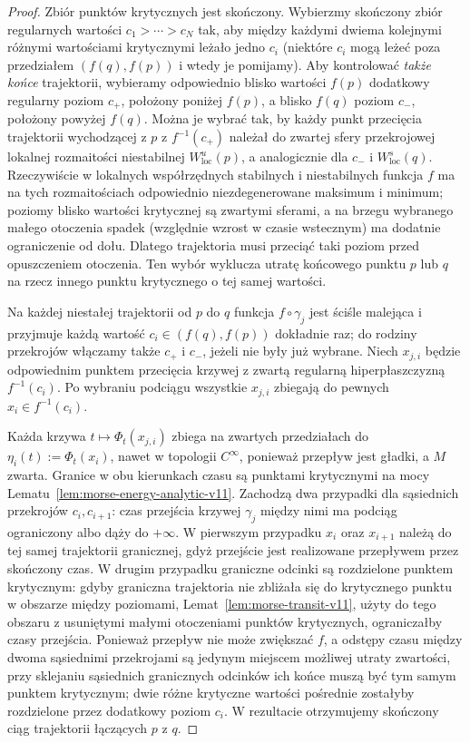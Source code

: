 \begin{proof}
Zbiór punktów krytycznych jest skończony. Wybierzmy
skończony zbiór regularnych wartości $c_1>\cdots>c_N$
tak, aby między każdymi dwiema kolejnymi różnymi wartościami
krytycznymi leżało jedno $c_i$ (niektóre $c_i$ mogą leżeć
poza przedziałem $(f(q),f(p))$ i wtedy je pomijamy).
Aby kontrolować \emph{także końce} trajektorii, wybieramy
odpowiednio blisko wartości $f(p)$ dodatkowy regularny
poziom $c_+$, położony poniżej $f(p)$, a blisko $f(q)$
poziom $c_-$, położony powyżej $f(q)$.
Można je wybrać tak, by każdy punkt przecięcia trajektorii
wychodzącej z $p$ z $f^{-1}(c_+)$ należał do zwartej
sfery przekrojowej lokalnej rozmaitości niestabilnej
$W^u_{\mathrm{loc}}(p)$, a analogicznie dla $c_-$
i $W^s_{\mathrm{loc}}(q)$. Rzeczywiście w lokalnych
współrzędnych stabilnych i niestabilnych funkcja $f$
ma na tych rozmaitościach odpowiednio niezdegenerowane
maksimum i minimum; poziomy blisko wartości krytycznej
są zwartymi sferami, a na brzegu wybranego małego
otoczenia spadek (względnie wzrost w czasie wstecznym)
ma dodatnie ograniczenie od dołu. Dlatego trajektoria
musi przeciąć taki poziom przed opuszczeniem otoczenia.
Ten wybór wyklucza utratę końcowego punktu $p$ lub $q$
na rzecz innego punktu krytycznego o tej samej wartości.

Na każdej niestałej trajektorii od $p$ do $q$ funkcja
$f\circ\gamma_j$ jest ściśle malejąca i przyjmuje każdą
wartość $c_i\in(f(q),f(p))$ dokładnie raz; do rodziny
przekrojów włączamy także $c_+$ i $c_-$, jeżeli nie były
już wybrane. Niech
$x_{j,i}$ będzie odpowiednim punktem przecięcia krzywej
z zwartą regularną hiperpłaszczyzną $f^{-1}(c_i)$.
Po wybraniu podciągu wszystkie $x_{j,i}$ zbiegają do pewnych
$x_i\in f^{-1}(c_i)$.

Każda krzywa $t\mapsto\Phi_t(x_{j,i})$ zbiega na zwartych
przedziałach do $\eta_i(t):=\Phi_t(x_i)$, nawet w topologii
$C^\infty$, ponieważ przepływ jest gładki, a $M$ zwarta.
Granice w obu kierunkach czasu są punktami krytycznymi
na mocy Lematu~\ref{lem:morse-energy-analytic-v11}.
Zachodzą dwa przypadki dla sąsiednich przekrojów $c_i,c_{i+1}$:
czas przejścia krzywej $\gamma_j$ między nimi ma podciąg
ograniczony albo dąży do $+\infty$.
W pierwszym przypadku $x_i$ oraz $x_{i+1}$ należą do tej
samej trajektorii granicznej, gdyż przejście jest realizowane
przepływem przez skończony czas.
W drugim przypadku graniczne odcinki są rozdzielone
punktem krytycznym: gdyby graniczna trajektoria nie
zbliżała się do krytycznego punktu w obszarze między
poziomami, Lemat~\ref{lem:morse-transit-v11}, użyty do
tego obszaru z usuniętymi małymi otoczeniami punktów
krytycznych, ograniczałby czasy przejścia.
Ponieważ przepływ nie może zwiększać $f$, a odstępy czasu
między dwoma sąsiednimi przekrojami są jedynym miejscem
możliwej utraty zwartości, przy sklejaniu
sąsiednich granicznych odcinków ich końce muszą być tym
samym punktem krytycznym; dwie różne krytyczne wartości
pośrednie zostałyby rozdzielone przez dodatkowy poziom
$c_i$. W rezultacie otrzymujemy skończony ciąg trajektorii
łączących $p$ z $q$.


\end{proof}
